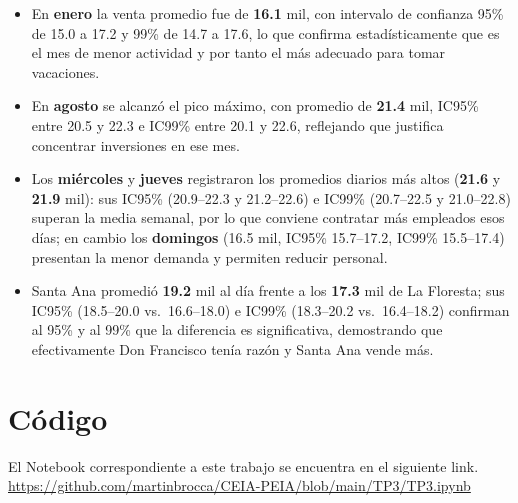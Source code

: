 \documentclass[12pt,a4paper]{article}
\begin{document}
\begin{itemize}
  \item En \textbf{enero} la venta promedio fue de \textbf{16.1} mil, con intervalo de confianza 95\% de 15.0 a 17.2 y 99\% de 14.7 a 17.6, lo que confirma estadísticamente que es el mes de menor actividad y por tanto el más adecuado para tomar vacaciones.
  \item En \textbf{agosto} se alcanzó el pico máximo, con promedio de \textbf{21.4} mil, IC95\% entre 20.5 y 22.3 e IC99\% entre 20.1 y 22.6, reflejando que justifica concentrar inversiones en ese mes.
  \item Los \textbf{miércoles} y \textbf{jueves} registraron los promedios diarios más altos (\textbf{21.6} y \textbf{21.9} mil): sus IC95\% (20.9–22.3 y 21.2–22.6) e IC99\% (20.7–22.5 y 21.0–22.8) superan la media semanal, por lo que conviene contratar más empleados esos días; en cambio los \textbf{domingos} (16.5 mil, IC95\% 15.7–17.2, IC99\% 15.5–17.4) presentan la menor demanda y permiten reducir personal.
  \item Santa Ana promedió \textbf{19.2} mil al día frente a los \textbf{17.3} mil de La Floresta; sus IC95\% (18.5–20.0 vs.\ 16.6–18.0) e IC99\% (18.3–20.2 vs.\ 16.4–18.2) confirman al 95\% y al 99\% que la diferencia es significativa, demostrando que efectivamente Don Francisco tenía razón y Santa Ana vende más.
\end{itemize}

\section*{Código}
El Notebook correspondiente a este trabajo se encuentra en el siguiente link. \newline \url{https://github.com/martinbrocca/CEIA-PEIA/blob/main/TP3/TP3.ipynb}
\end{document}

